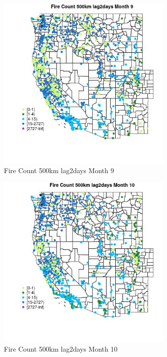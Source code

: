 \begin{figure} 
\centering  
\includegraphics[width=0.77\textwidth]{Code_Outputs/Report_ML_input_PM25_Step4_part_f_de_duplicated_aves_prioritize_24hr_obswNAs_MapObsMo9Fire_Count_500km_lag2days.jpg} 
\caption{\label{fig:Report_ML_input_PM25_Step4_part_f_de_duplicated_aves_prioritize_24hr_obswNAsMapObsMo9Fire_Count_500km_lag2days}Fire Count 500km lag2days Month 9} 
\end{figure} 
 

\begin{figure} 
\centering  
\includegraphics[width=0.77\textwidth]{Code_Outputs/Report_ML_input_PM25_Step4_part_f_de_duplicated_aves_prioritize_24hr_obswNAs_MapObsMo10Fire_Count_500km_lag2days.jpg} 
\caption{\label{fig:Report_ML_input_PM25_Step4_part_f_de_duplicated_aves_prioritize_24hr_obswNAsMapObsMo10Fire_Count_500km_lag2days}Fire Count 500km lag2days Month 10} 
\end{figure} 
 


